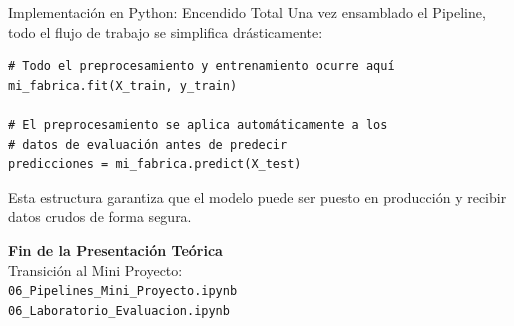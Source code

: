 \documentclass{beamer}
\begin{document}
\begin{frame}[fragile]{Implementación en Python: Encendido Total}
    Una vez ensamblado el Pipeline, todo el flujo de trabajo se simplifica drásticamente:
    \vspace{0.3cm}
    \begin{verbatim}
# Todo el preprocesamiento y entrenamiento ocurre aquí
mi_fabrica.fit(X_train, y_train)

# El preprocesamiento se aplica automáticamente a los 
# datos de evaluación antes de predecir
predicciones = mi_fabrica.predict(X_test)
    \end{verbatim}
    \vspace{0.3cm}
    Esta estructura garantiza que el modelo puede ser puesto en producción y recibir datos crudos de forma segura.
\end{frame}

\begin{frame}[fragile]
    \begin{center}
        \Large \textbf{Fin de la Presentación Teórica}\\
        \vspace{0.5cm}
        \normalsize Transición al Mini Proyecto:\\
        \vspace{0.2cm}
        \verb|06_Pipelines_Mini_Proyecto.ipynb|\\
        \vspace{0.2cm}
        \verb|06_Laboratorio_Evaluacion.ipynb|
    \end{center}
\end{frame}
\end{document}
